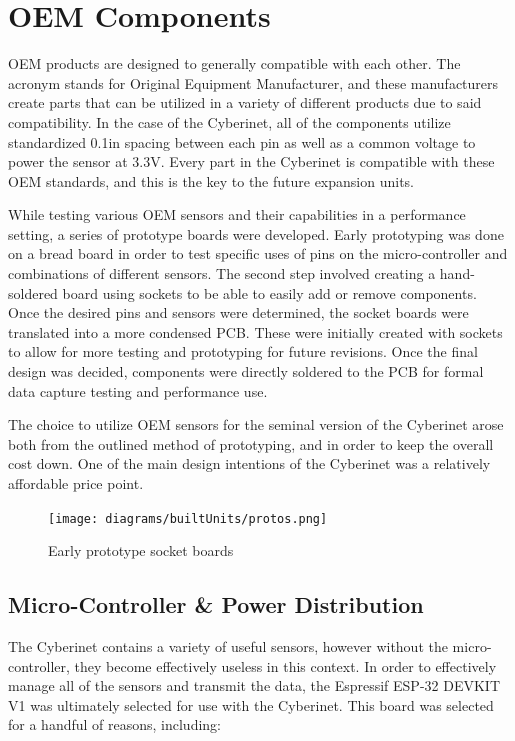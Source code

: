 \section{OEM Components}

OEM products are designed to generally compatible with each other. The acronym stands for Original Equipment Manufacturer, and these manufacturers create parts that can be utilized in a variety of different products due to said compatibility. In the case of the Cyberinet, all of the components utilize standardized 0.1in spacing between each pin as well as a common voltage to power the sensor at 3.3V. Every part in the Cyberinet is compatible with these OEM standards, and this is the key to the future expansion units.

While testing various OEM sensors and their capabilities in a performance setting, a series of prototype boards were developed. Early prototyping was done on a bread board in order to test specific uses of pins on the micro-controller and combinations of different sensors. The second step involved creating a hand-soldered board using sockets to be able to easily add or remove components. Once the desired pins and sensors were determined, the socket boards were translated into a more condensed PCB. These were initially created with sockets to allow for more testing and prototyping for future revisions. Once the final design was decided, components were directly soldered to the PCB for formal data capture testing and performance use.

The choice to utilize OEM sensors for the seminal version of the Cyberinet arose both from the outlined method of prototyping, and in order to keep the overall cost down. One of the main design intentions of the Cyberinet was a relatively affordable price point. 

\begin{figure}
    \centering
    \texttt{[image: diagrams/builtUnits/protos.png]}
    \caption{Early prototype socket boards}
    \label{fig:protoBoard}
\end{figure}



\subsection{Micro-Controller \& Power Distribution}

The Cyberinet contains a variety of useful sensors, however without the micro-controller, they become effectively useless in this context. In order to effectively manage all of the sensors and transmit the data, the Espressif ESP-32 DEVKIT V1 was ultimately selected for use with the Cyberinet. This board was selected for a handful of reasons, including:

